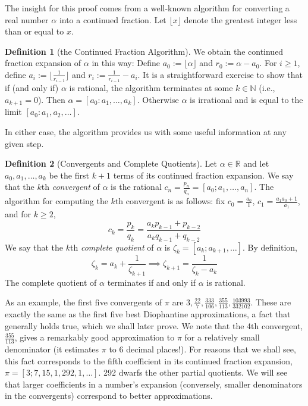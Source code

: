 \documentclass[12pt, letterpaper, oneside]{book}
\newcommand{\ga}{\ensuremath{\alpha}}
\newcommand{\gz}{\ensuremath{\zeta}}
\newcommand{\floor}[1]{\lfloor {#1} \rfloor}
\newcommand{\R}{\mathbb{R}}
\newcommand{\N}{\mathbb{N}}
\theoremstyle{plain}
\theoremstyle{definition}
\newtheorem{definition}{Definition}
\theoremstyle{remark}
\begin{document}
The insight for this proof comes from a well-known algorithm for
converting a real number $\ga$ into a continued fraction. Let
$\floor{x}$ denote the greatest integer less than or equal to
$x$.
\begin{definition}[the Continued Fraction Algorithm]
We obtain the continued fraction expansion of $\ga$ in this way: Define $a_0 := \floor{\ga}$ and $r_0 := \ga - a_0$. For
$i \geq 1$, define $a_i := \floor{\frac{1}{r_{i-1}}}$ and
$r_i := \frac{1}{ r_{i-1}} - a_i$. It is a straightforward exercise to show that if (and only if) $\ga$ is rational, the algorithm terminates at some $k \in \N$ (i.e., $a_{k+1} = 0$). Then $\ga = [a_0:a_1,\ldots,a_k].$ Otherwise $\ga$ is irrational and is equal to the limit $[a_0:a_1,a_2,\ldots].$ 
\end{definition}
In either case, the algorithm provides us with some useful
information at any given step.


\begin{definition}[Convergents and Complete Quotients]
  Let $\ga \in \R$ and let $a_0,a_1,\ldots,a_k$ be the first $k+1$ terms of its continued fraction expansion. We say that
  the $k$th \textit{convergent} of $\ga$ is the rational
  $c_n = \frac{p_n}{q_n} = [a_0; a_1,\ldots,a_n]$. The algorithm for
  computing the $k$th convergent is as follows: fix
  $c_0 = \frac{a_0}{1}$, $c_1 = \frac{a_1a_0+1}{a_1}$, and for
  $k\geq2$,
  \[
  c_k=\frac{p_k}{q_k}=\frac{a_kp_{k-1}+p_{k-2}}{a_kq_{k-1}+q_{k-2}}
  \]
  We say that the $k$th \textit{complete quotient} of $\ga$ is
  $\gz_k = [a_k; a_{k+1}, \ldots].$ By definition,
  \[ \gz_k = a_k + \frac{1}{\gz_{k+1}} \implies \gz_{k+1} =
    \frac{1}{\gz_k - a_k} \]
  The complete quotient of $\ga$ terminates if and only if $\ga$ is
  rational.
\end{definition}

As an example, the first five convergents of $\pi$ are
$3,\frac{22}{7},\frac{333}{106},\frac{355}{113}, \frac{103993}{332102}$. These are exactly the same as the first five best Diophantine approximations, a fact that generally holds true, which we shall later prove. We note that the
4th convergent, $\frac{355}{113}$, gives a remarkably good
approximation to $\pi$ for a relatively small denominator (it estimates $\pi$ to 6 decimal places!). For reasons that we shall see, this fact
corresponds to the fifth coefficient in its continued fraction
expansion, $\pi = [3; 7, 15, 1, 292, 1, \ldots]$. 292 dwarfs the other partial quotients. We will see that larger
coefficients in a number's expansion (conversely, smaller denominators in the
convergents) correspond to better approximations.
\end{document}
